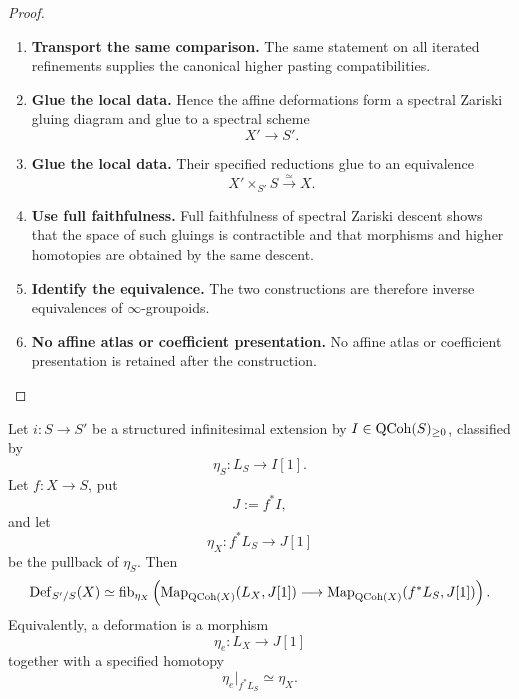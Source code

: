 \begin{proof}
\begin{enumerate}[label=\textup{(\arabic*)}]
    \item \textbf{Transport the same comparison.}
    The same statement on all iterated refinements supplies the canonical higher pasting
    compatibilities.

    \item \textbf{Glue the local data.}
    Hence the affine deformations form a spectral Zariski gluing diagram and glue to a spectral
    scheme
    \[
        X'\longrightarrow S'.
    \]

    \item \textbf{Glue the local data.}
    Their specified reductions glue to an equivalence
    \[
        X'\times_{S'}S\xrightarrow{\simeq}X.
    \]

    \item \textbf{Use full faithfulness.}
    Full faithfulness of spectral Zariski descent shows that the space of such gluings is
    contractible and that morphisms and higher homotopies are obtained by the same descent.

    \item \textbf{Identify the equivalence.}
    The two constructions are therefore inverse equivalences of \(\infty\)-groupoids.

    \item \textbf{No affine atlas or coefficient presentation.}
    No affine atlas or coefficient presentation is retained after the construction.
\end{enumerate}
\end{proof}

\begin{theorem}
\label{thm:global-deformation-homotopy-fibre}
Let \(i:S\to S'\) be a structured infinitesimal extension by
\(I\in\operatorname{QCoh}(S)_{\geq0}\), classified by
\[
    \eta_S:L_S\longrightarrow I[1].
\]
Let \(f:X\to S\), put
\[
    J:=f^*I,
\]
and let
\[
    \eta_X:
    f^*L_S
    \longrightarrow
    J[1]
\]
be the pullback of \(\eta_S\). Then
\[
\operatorname{Def}_{S'/S}(X)
\simeq
\operatorname{fib}_{\eta_X}
\left(
    \operatorname{Map}_{\operatorname{QCoh}(X)}(L_X,J[1])
    \longrightarrow
    \operatorname{Map}_{\operatorname{QCoh}(X)}(f^*L_S,J[1])
\right).
\]
Equivalently, a deformation is a morphism
\[
    \eta_e:L_X\longrightarrow J[1]
\]
together with a specified homotopy
\[
    \eta_e|_{f^*L_S}\simeq\eta_X.
\]
\end{theorem}

